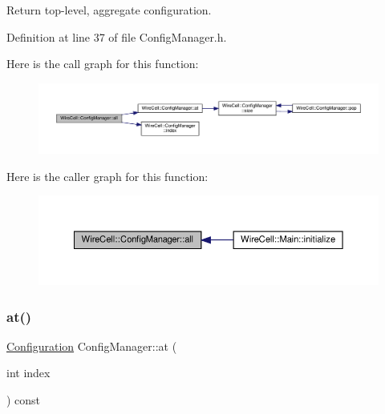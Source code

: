Return top-\/level, aggregate configuration. 



Definition at line 37 of file Config\+Manager.\+h.

Here is the call graph for this function\+:
\nopagebreak
\begin{figure}[H]
\begin{center}
\leavevmode
\includegraphics[width=350pt]{class_wire_cell_1_1_config_manager_a51fb922bec307a48b4e7424d5d417955_cgraph}
\end{center}
\end{figure}
Here is the caller graph for this function\+:
\nopagebreak
\begin{figure}[H]
\begin{center}
\leavevmode
\includegraphics[width=350pt]{class_wire_cell_1_1_config_manager_a51fb922bec307a48b4e7424d5d417955_icgraph}
\end{center}
\end{figure}
\mbox{\label{class_wire_cell_1_1_config_manager_a598ade80af4432ce25beac1d2ba3028e}} 
\subsubsection{\texorpdfstring{at()}{at()}}
{\footnotesize\ttfamily \hyperlink{namespace_wire_cell_a9f705541fc1d46c608b3d32c182333ee}{Configuration} Config\+Manager\+::at (\begin{DoxyParamCaption}\item[{int}]{index }\end{DoxyParamCaption}) const}



